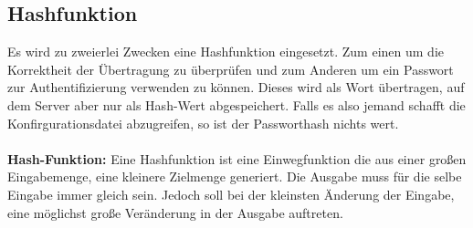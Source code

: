 \subsection{Hashfunktion}
Es wird zu zweierlei Zwecken eine Hashfunktion eingesetzt. Zum einen um die Korrektheit der Übertragung zu überprüfen und zum Anderen um ein Passwort zur Authentifizierung verwenden zu können. Dieses wird als Wort übertragen, auf dem Server aber nur als Hash-Wert abgespeichert. Falls es also jemand schafft die Konfirgurationsdatei abzugreifen, so ist der Passworthash nichts wert.\\\\
\textbf{Hash-Funktion:} Eine Hashfunktion ist eine Einwegfunktion die aus einer großen Eingabemenge, eine kleinere Zielmenge generiert.  Die Ausgabe muss für die selbe Eingabe immer gleich sein. Jedoch soll bei der kleinsten Änderung der Eingabe, eine möglichst große Veränderung in der Ausgabe auftreten.
